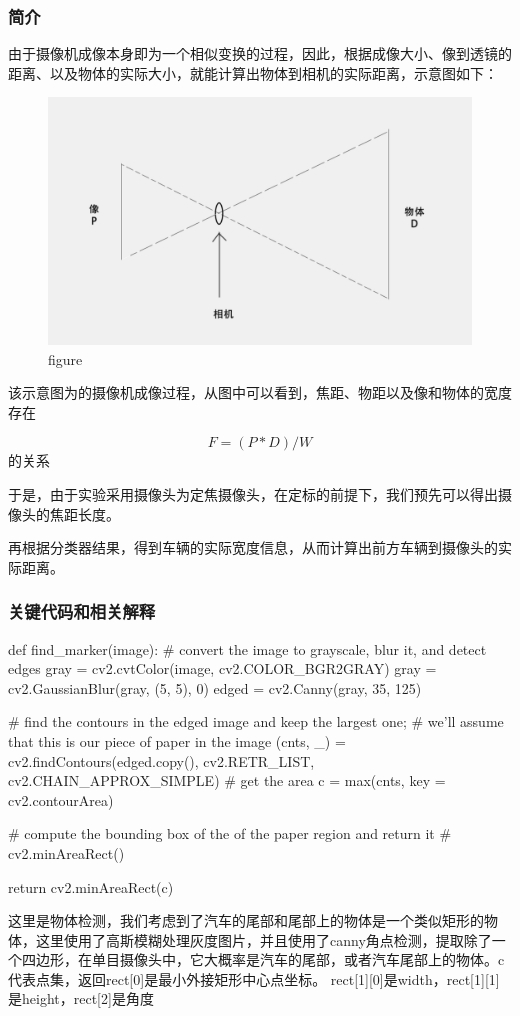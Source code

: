 \documentclass[12pt]{report}
\begin{document}
\subsubsection{简介}
由于摄像机成像本身即为一个相似变换的过程，因此，根据成像大小、像到透镜的距离、以及物体的实际大小，就能计算出物体到相机的实际距离，示意图如下：

\begin{figure}[h]

  \center
  \includegraphics[width=.8\textwidth]{distance.png} %
  \caption{figure} %
  \label{Distance} %
\end{figure}

该示意图为的摄像机成像过程，从图中可以看到，焦距、物距以及像和物体的宽度存在

\begin{equation}
F=(P*D)/W
\end{equation}
的关系

于是，由于实验采用摄像头为定焦摄像头，在定标的前提下，我们预先可以得出摄像头的焦距长度。

再根据分类器结果，得到车辆的实际宽度信息，从而计算出前方车辆到摄像头的实际距离。
\subsubsection{关键代码和相关解释}
\begin{python}
def find_marker(image):
    # convert the image to grayscale, blur it, and detect edges
    gray = cv2.cvtColor(image, cv2.COLOR_BGR2GRAY)  
    gray = cv2.GaussianBlur(gray, (5, 5), 0)        
    edged = cv2.Canny(gray, 35, 125)               
 
    # find the contours in the edged image and keep the largest one;
    # we'll assume that this is our piece of paper in the image
    (cnts, _) = cv2.findContours(edged.copy(), cv2.RETR_LIST, cv2.CHAIN_APPROX_SIMPLE)
    # get the area
    c = max(cnts, key = cv2.contourArea)
 
    # compute the bounding box of the of the paper region and return it
    # cv2.minAreaRect() 
  
    return cv2.minAreaRect(c)
\end{python}
这里是物体检测，我们考虑到了汽车的尾部和尾部上的物体是一个类似矩形的物体，这里使用了高斯模糊处理灰度图片，并且使用了canny角点检测，提取除了一个四边形，在单目摄像头中，它大概率是汽车的尾部，或者汽车尾部上的物体。c代表点集，返回rect[0]是最小外接矩形中心点坐标。 rect[1][0]是width，rect[1][1]是height，rect[2]是角度
\end{document}
